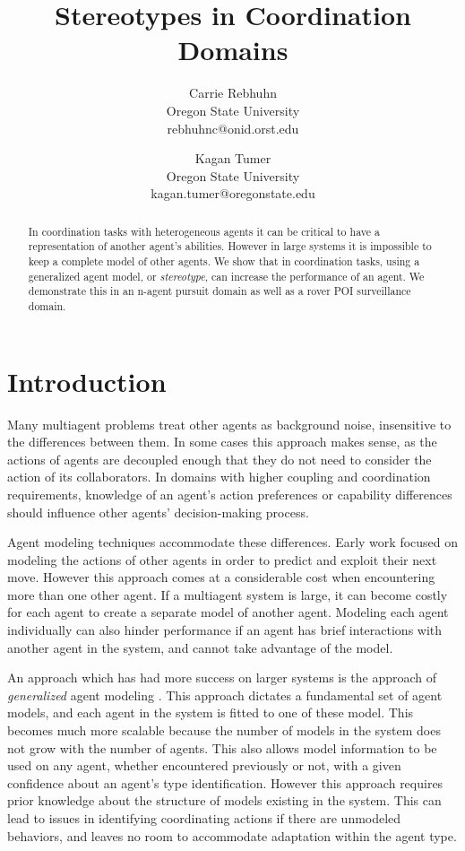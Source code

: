 \documentclass{aamas2014}
\title{Stereotypes in Coordination Domains}
\author{Carrie Rebhuhn \\
Oregon State University \\
rebhuhnc@onid.orst.edu
 \and Kagan Tumer \\
 Oregon State University \\ 
 kagan.tumer@oregonstate.edu
 }
\begin{document}
\maketitle

\begin{abstract}
In coordination tasks with heterogeneous agents it can be critical to have a representation of another agent's abilities. However in large systems it is impossible to keep a complete model of other agents. We show that in coordination tasks, using a generalized agent model, or \emph{stereotype}, can increase the performance of an agent. We demonstrate this in an n-agent pursuit domain as well as a rover POI surveillance domain.

\vspace{1in}

\end{abstract}

\section{Introduction}

Many multiagent problems treat other agents as background noise, insensitive to the differences between them. In some cases this approach makes sense, as the actions of agents are decoupled enough that they do not need to consider the action of its collaborators. In domains with higher coupling and coordination requirements, knowledge of an agent's action preferences or capability differences should influence other agents' decision-making process.


Agent modeling techniques accommodate these differences. Early work focused on modeling the actions of other agents in order to predict and exploit their next move. However this approach comes at a considerable cost when encountering more than one other agent. If a multiagent system is large, it can become costly for each agent to create a separate model of another agent. Modeling each agent individually can also hinder performance if an agent has brief interactions with another agent in the system, and cannot take advantage of the model.

An approach which has had more success on larger systems is the approach of \emph{generalized} agent modeling \cite{GOM}. This approach dictates a fundamental set of agent models, and each agent in the system is fitted to one of these model. This becomes much more scalable because the number of models in the system does not grow with the number of agents. This also allows model information to be used on any agent, whether encountered previously or not, with a given confidence about an agent's type identification. However this approach requires prior knowledge about the structure of models existing in the system. This can lead to issues in identifying coordinating actions if there are unmodeled behaviors, and leaves no room to accommodate adaptation within the agent type.
\end{document}
